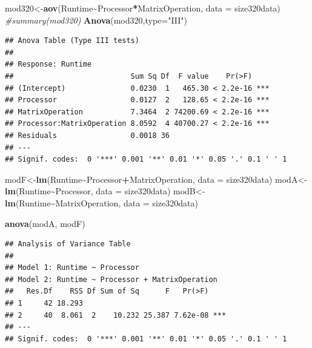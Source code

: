 \documentclass[
]{article}
\newenvironment{Shaded}{\begin{snugshade}}{\end{snugshade}}
\newcommand{\CommentTok}[1]{\textcolor[rgb]{0.56,0.35,0.01}{\textit{#1}}}
\newcommand{\DataTypeTok}[1]{\textcolor[rgb]{0.13,0.29,0.53}{#1}}
\newcommand{\KeywordTok}[1]{\textcolor[rgb]{0.13,0.29,0.53}{\textbf{#1}}}
\newcommand{\NormalTok}[1]{#1}
\newcommand{\OperatorTok}[1]{\textcolor[rgb]{0.81,0.36,0.00}{\textbf{#1}}}
\newcommand{\StringTok}[1]{\textcolor[rgb]{0.31,0.60,0.02}{#1}}
\begin{document}
\begin{Shaded}
\begin{Highlighting}[]
\NormalTok{mod320\textless{}{-}}\KeywordTok{aov}\NormalTok{(Runtime}\OperatorTok{\textasciitilde{}}\NormalTok{Processor}\OperatorTok{*}\NormalTok{MatrixOperation, }\DataTypeTok{data =}\NormalTok{ size320data)}
\CommentTok{\#summary(mod320)}
\KeywordTok{Anova}\NormalTok{(mod320,}\DataTypeTok{type=}\StringTok{"III"}\NormalTok{)}
\end{Highlighting}
\end{Shaded}

\begin{verbatim}
## Anova Table (Type III tests)
## 
## Response: Runtime
##                           Sum Sq Df  F value    Pr(>F)    
## (Intercept)               0.0230  1   465.30 < 2.2e-16 ***
## Processor                 0.0127  2   128.65 < 2.2e-16 ***
## MatrixOperation           7.3464  2 74200.69 < 2.2e-16 ***
## Processor:MatrixOperation 8.0592  4 40700.27 < 2.2e-16 ***
## Residuals                 0.0018 36                       
## ---
## Signif. codes:  0 '***' 0.001 '**' 0.01 '*' 0.05 '.' 0.1 ' ' 1
\end{verbatim}

\begin{Shaded}
\begin{Highlighting}[]
\NormalTok{modF\textless{}{-}}\KeywordTok{lm}\NormalTok{(Runtime}\OperatorTok{\textasciitilde{}}\NormalTok{Processor}\OperatorTok{+}\NormalTok{MatrixOperation, }\DataTypeTok{data =}\NormalTok{ size320data)}
\NormalTok{modA\textless{}{-}}\KeywordTok{lm}\NormalTok{(Runtime}\OperatorTok{\textasciitilde{}}\NormalTok{Processor, }\DataTypeTok{data =}\NormalTok{ size320data)}
\NormalTok{modB\textless{}{-}}\KeywordTok{lm}\NormalTok{(Runtime}\OperatorTok{\textasciitilde{}}\NormalTok{MatrixOperation, }\DataTypeTok{data =}\NormalTok{ size320data)}

\KeywordTok{anova}\NormalTok{(modA, modF)}
\end{Highlighting}
\end{Shaded}

\begin{verbatim}
## Analysis of Variance Table
## 
## Model 1: Runtime ~ Processor
## Model 2: Runtime ~ Processor + MatrixOperation
##   Res.Df    RSS Df Sum of Sq      F   Pr(>F)    
## 1     42 18.293                                 
## 2     40  8.061  2    10.232 25.387 7.62e-08 ***
## ---
## Signif. codes:  0 '***' 0.001 '**' 0.01 '*' 0.05 '.' 0.1 ' ' 1
\end{verbatim}
\end{document}
